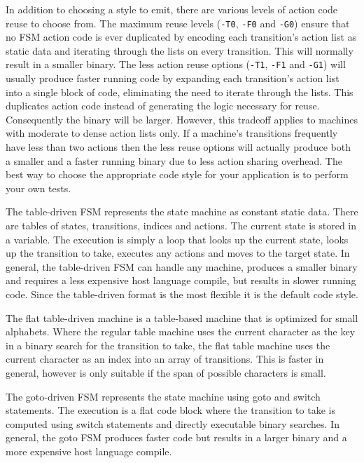 \documentclass[letterpaper,11pt,oneside]{book}
\begin{document}
In addition to choosing a style to emit, there are various levels of action
code reuse to choose from.  The maximum reuse levels (\verb|-T0|, \verb|-F0|
and \verb|-G0|) ensure that no FSM action code is ever duplicated by encoding
each transition's action list as static data and iterating
through the lists on every transition. This will normally result in a smaller
binary. The less action reuse options (\verb|-T1|, \verb|-F1| and \verb|-G1|)
will usually produce faster running code by expanding each transition's action
list into a single block of code, eliminating the need to iterate through the
lists. This duplicates action code instead of generating the logic necessary
for reuse. Consequently the binary will be larger. However, this tradeoff applies to
machines with moderate to dense action lists only. If a machine's transitions
frequently have less than two actions then the less reuse options will actually
produce both a smaller and a faster running binary due to less action sharing
overhead. The best way to choose the appropriate code style for your
application is to perform your own tests.

The table-driven FSM represents the state machine as constant static data. There are
tables of states, transitions, indices and actions. The current state is
stored in a variable. The execution is simply a loop that looks up the current
state, looks up the transition to take, executes any actions and moves to the
target state. In general, the table-driven FSM can handle any machine, produces
a smaller binary and requires a less expensive host language compile, but
results in slower running code.  Since the table-driven format is the most
flexible it is the default code style.

The flat table-driven machine is a table-based machine that is optimized for
small alphabets. Where the regular table machine uses the current character as
the key in a binary search for the transition to take, the flat table machine
uses the current character as an index into an array of transitions. This is
faster in general, however is only suitable if the span of possible characters
is small.

The goto-driven FSM represents the state machine using goto and switch
statements. The execution is a flat code block where the transition to take is
computed using switch statements and directly executable binary searches.  In
general, the goto FSM produces faster code but results in a larger binary and a
more expensive host language compile.
\end{document}
